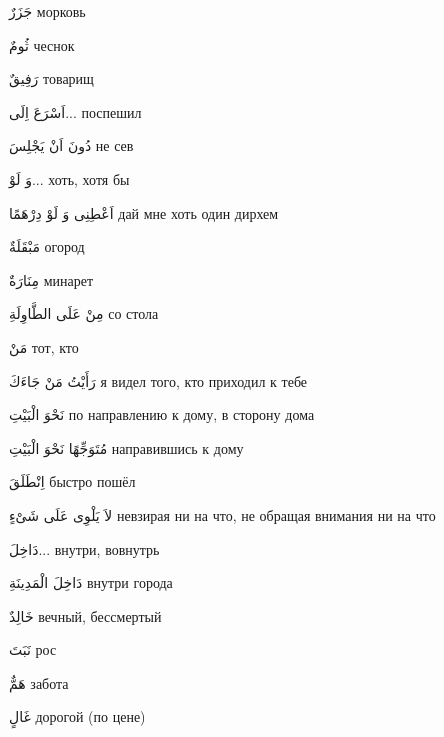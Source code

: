 \documentclass[a5paper]{article}
\newcommand\textstyleDropCaps[1]{#1}
\newcommand\textstyleCaptioncharacters[1]{#1}
\begin{document}
\textstyleCaptioncharacters{جَزَرٌ }\textstyleDropCaps{морковь‎}

\textstyleCaptioncharacters{ثُومٌ }\textstyleDropCaps{чеснок‎}

\textstyleCaptioncharacters{رَفِيقٌ }\textstyleDropCaps{товарищ‎}

\textstyleCaptioncharacters{اَسْرَعَ اِلَى...ِ }\textstyleDropCaps{поспешил‎}

\textstyleCaptioncharacters{دُونَ اَنْ يَجْلِسَ }\textstyleDropCaps{не сев‎}

\textstyleCaptioncharacters{وَ لَوْ...ِ }\textstyleDropCaps{хоть, хотя бы‎}

\textstyleCaptioncharacters{اَعْطِنِى وَ لَوْ دِرْهَمًا }\textstyleDropCaps{дай мне хоть один дирхем‎}

\textstyleCaptioncharacters{مَبْقَلَةٌ }\textstyleDropCaps{огород‎}

\textstyleCaptioncharacters{مِنَارَةٌ }\textstyleDropCaps{минарет‎}

\textstyleCaptioncharacters{مِنْ عَلَى الطَّاوِلَةِ }\textstyleDropCaps{со стола‎}

\textstyleCaptioncharacters{مَنْ }\textstyleDropCaps{тот, кто‎}

\textstyleCaptioncharacters{رَأَيْتُ مَنْ جَاءَكَ }\textstyleDropCaps{я ви­дел того, кто приходил к тебе‎}

\textstyleCaptioncharacters{نَحْوَ الْبَيْتِ }\textstyleDropCaps{по направле­нию к дому, в сторону дома‎}

\textstyleCaptioncharacters{مُتَوَجِّهًا نَحْوَ الْبَيْتِ }\textstyleDropCaps{направившись к дому‎}

\textstyleCaptioncharacters{اِنْطَلَقَ }\textstyleDropCaps{быстро пошёл‎}

\textstyleCaptioncharacters{لاَ يَلْوِى عَلَى شَىْءٍ }\textstyleDropCaps{не­взирая ни на что, не обращая внимания ни на что‎}

\textstyleCaptioncharacters{دَاخِلَ...ِ }\textstyleDropCaps{внутри, во­внутрь‎}

\textstyleCaptioncharacters{دَاخِلَ الْمَدِينَةِ }\textstyleDropCaps{внутри города‎}

\textstyleCaptioncharacters{خَالِدٌ }\textstyleDropCaps{вечный, бессмертый‎}

\textstyleCaptioncharacters{نَبَتَ }\textstyleDropCaps{рос‎}

\textstyleCaptioncharacters{هَمٌّ }\textstyleDropCaps{забота‎}

\textstyleCaptioncharacters{غَالٍ }\textstyleDropCaps{дорогой (по цене)‎}
\end{document}
